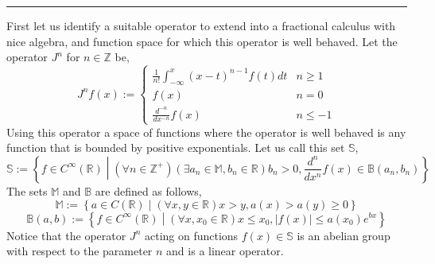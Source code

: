 \documentclass[%
 preprint,
 amsmath, amssymb, aps, pra, 10pt
]{revtex4-2}
\begin{document}
\noindent\rule{\textwidth}{1pt}
First let us identify a suitable operator to extend into a fractional calculus with nice algebra, and function space for which this operator is well behaved. Let the operator $J^n$ for $n \in \mathbb{Z}$ be,
\begin{equation}
J^n f(x) := \begin{cases} \frac{1}{n!}\int_{-\infty}^x (x - t)^{n - 1}f(t)dt & n \geq 1 \\ f(x) & n = 0 \\ \frac{d^{-n}}{dx^{-n}}f(x) & n \leq -1 \end{cases}
\label{integer_calculus}
\end{equation}
Using this operator a space of functions where the operator is well behaved is any function that is bounded by positive exponentials. Let us call this set $\mathbb{S}$,
\begin{equation}
\mathbb{S} := \left\lbrace f \in C^\infty(\mathbb{R}) \middle| (\forall n \in \mathbb{Z}^+)(\exists a_n \in \mathbb{M}, b_n \in \mathbb{R}) b_n > 0, \frac{d^n}{dx^n}f(x) \in \mathbb{B}(a_n, b_n) \right\rbrace
\label{exponentialy_bounded}
\end{equation}
The sets $\mathbb{M}$ and $\mathbb{B}$ are defined as follows,
\[\mathbb{M} := \left\lbrace a \in C(\mathbb{R}) \middle| (\forall x, y \in \mathbb{R}) x > y, a(x) > a(y) \geq 0 \right\rbrace\]
\[\mathbb{B}(a, b) := \left\lbrace f \in C^\infty(\mathbb{R}) \middle| (\forall x, x_0 \in \mathbb{R}) x \leq x_0, |f(x)| \leq a(x_0)e^{bx} \right\rbrace\]
Notice that the operator $J^n$ acting on functions $f(x) \in \mathbb{S}$ is an abelian group with respect to the parameter $n$ and is a linear operator.
\end{document}
